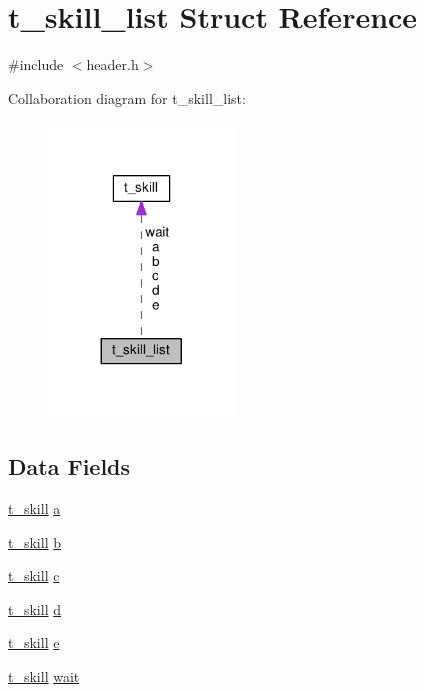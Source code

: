 \hypertarget{structt__skill__list}{\section{t\-\_\-skill\-\_\-list Struct Reference}
\label{structt__skill__list}
}


{\ttfamily \#include $<$header.\-h$>$}



Collaboration diagram for t\-\_\-skill\-\_\-list\-:
\nopagebreak
\begin{figure}[H]
\begin{center}
\leavevmode
\includegraphics[width=140pt]{structt__skill__list__coll__graph}
\end{center}
\end{figure}
\subsection*{Data Fields}
\begin{DoxyCompactItemize}
\item 
\hyperlink{structt__skill}{t\-\_\-skill} \hyperlink{structt__skill__list_a39a494bb9ce01ba13ea4577fe2b1cc79}{a}
\item 
\hyperlink{structt__skill}{t\-\_\-skill} \hyperlink{structt__skill__list_a85ae40dbaecefd131b936ec65e9f4809}{b}
\item 
\hyperlink{structt__skill}{t\-\_\-skill} \hyperlink{structt__skill__list_ac9055dd2d5c45c223e3b0e1920c31493}{c}
\item 
\hyperlink{structt__skill}{t\-\_\-skill} \hyperlink{structt__skill__list_a0bb2c4a26ff65aecd7a36ad7ee898cd8}{d}
\item 
\hyperlink{structt__skill}{t\-\_\-skill} \hyperlink{structt__skill__list_aa756d3dbc91762775cff0f4b52526a70}{e}
\item 
\hyperlink{structt__skill}{t\-\_\-skill} \hyperlink{structt__skill__list_a2a4af1a4acb8da6061990f9bd8d0a564}{wait}
\end{DoxyCompactItemize}


